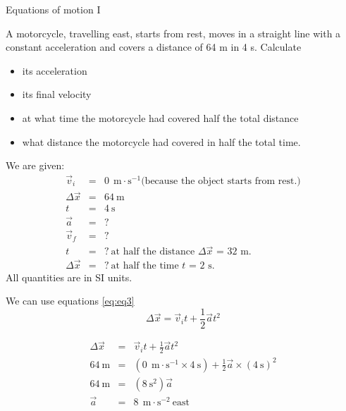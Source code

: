 \begin{wex}{Equations of motion I}{A motorcycle, travelling east, starts from rest, moves in a straight line with a constant acceleration and covers a distance of 64 m in 4 s. Calculate
\begin{itemize}
\item its acceleration
\item its final velocity
\item at what time the motorcycle had covered half the total distance
\item what distance the motorcycle had covered in half the total time.
\end{itemize}}
{
We are given:
\begin{eqnarray*}
\vec{v}_i&=&0\ ~\text{m}\cdot \text{s}^{-1} \mbox{(because the object starts from rest.)}\\
\Delta \vec{x}&=&64\ \text{m}\\
t&=&4\ \text{s}\\
\vec{a}&=&?\\
\vec{v}_f&=&?\\
t&=&?\ \mbox{at half the distance $\Delta \vec{x}$~=~32~m.}\\
\Delta \vec{x}&=&?\ \mbox{at half the time $t$~=~2~s.}
\end{eqnarray*}
All quantities are in SI units.

We can use equations \ref{eq:eq3}
\begin{displaymath}
\Delta \vec{x} = \vec{v}_it +\frac{1}{2}\vec{a}t^2
\end{displaymath}

\begin{eqnarray*}
\Delta \vec{x} &=& \vec{v}_it +\frac{1}{2}\vec{a}t^2\\
64\ \text{m} &=& (0\ ~\text{m}\cdot \text{s}^{-1} \times 4\ \text{s}) + \frac{1}{2} \vec{a} \times (4\ \text{s})^2\\
64\ \text{m} &=& (8\ \text{s}^2) \vec{a}\\
\vec{a} &=&8\ ~\text{m}\cdot \text{s}^{-2}~\text{east}
\end{eqnarray*}

}
\end{wex}
